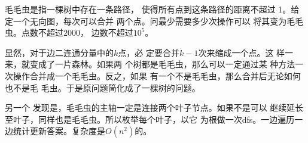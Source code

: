 \begin{prob}
	毛毛虫是指一棵树中存在一条路径，
	使得所有点到这条路径的距离不超过
	1。给定一个无向图，每次可以合并
	两个点。问最少需要多少次操作可以
	将其变为毛毛虫。点数不超过$2000$，
	边数不超过$10^5$。
\end{prob}

\begin{sol}
	显然，对于边二连通分量中的$k$点，必
	定要合并$k-1$次来缩成一个点。这
	样一来，就变成了一片森林。如果两
	个树都是毛毛虫，那么可以一定通过某
	种方法一次操作合并成一个毛毛虫。反之，如果
	有一个不是毛毛虫，那么合并后无论如何也不是毛
	毛虫。于是原问题简化成了一棵树的问题。
	\par 另一个
	发现是，毛毛虫的主轴一定是连接两个叶子节点。如果不是可以
	继续延长至叶子，同样也是毛毛虫。所以枚举每个叶子，以它
	为根做一次dfs。一边遍历一边统计更新答案。复杂度是$O(n^2)$的。
\end{sol}
